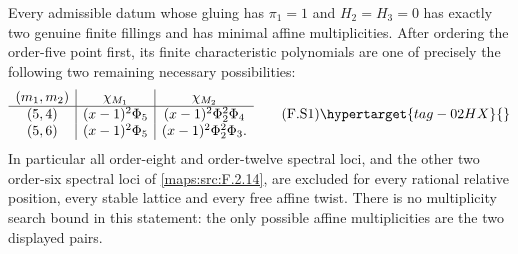 



\begin{theorem}\hypertarget{tag-02NF}{}\label{maps:src:F.2.25}


Every admissible datum whose gluing has $\pi_1=1$ and $H_2=H_3=0$ has
exactly two genuine finite fillings and has minimal affine
multiplicities.  After ordering the order-five point first,
its finite characteristic polynomials are one of precisely
the following two remaining necessary possibilities:
\[
\begin{array}{c|c|c}
 (m_1,m_2)&\chi_{M_1}&\chi_{M_2}\\\hline
 (5,4)&(x-1)^2\Phi_5&(x-1)^2\Phi_2^2\Phi_4\\
 (5,6)&(x-1)^2\Phi_5&(x-1)^2\Phi_2^2\Phi_3.
\end{array}
 \tag{F.S1}\hypertarget{tag-02HX}{}\label{maps:eq:F.S1}
\]
In particular all order-eight and order-twelve spectral
loci, and the other two order-six spectral loci of \ref{maps:src:F.2.14},
are excluded for every rational relative position, every
stable lattice and every free affine twist.
There is no multiplicity search bound in this statement:
the only possible affine multiplicities are the
two displayed pairs.

\end{theorem}


